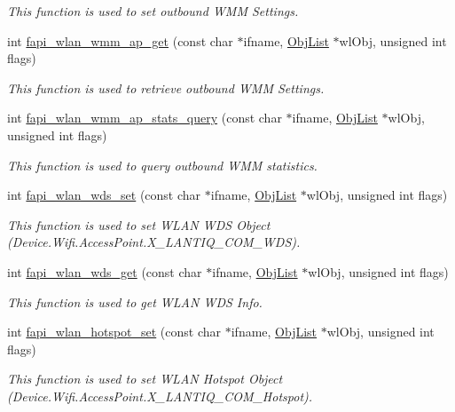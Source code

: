 \begin{DoxyCompactItemize}
\begin{DoxyCompactList}\small\item\em This function is used to set outbound W\-M\-M Settings. \end{DoxyCompactList}\item 
int \hyperlink{group__FAPI__WLAN_ga2e376f7c91b1ad78798cef51e687d574}{fapi\-\_\-wlan\-\_\-wmm\-\_\-ap\-\_\-get} (const char $\ast$ifname, \hyperlink{structObjList}{Obj\-List} $\ast$wl\-Obj, unsigned int flags)
\begin{DoxyCompactList}\small\item\em This function is used to retrieve outbound W\-M\-M Settings. \end{DoxyCompactList}\item 
int \hyperlink{group__FAPI__WLAN_gaa266e1fd19620a8d479804d74052a014}{fapi\-\_\-wlan\-\_\-wmm\-\_\-ap\-\_\-stats\-\_\-query} (const char $\ast$ifname, \hyperlink{structObjList}{Obj\-List} $\ast$wl\-Obj, unsigned int flags)
\begin{DoxyCompactList}\small\item\em This function is used to query outbound W\-M\-M statistics. \end{DoxyCompactList}\item 
int \hyperlink{group__FAPI__WLAN_gaf7b35fbc48c273637fafb13bbe2318fa}{fapi\-\_\-wlan\-\_\-wds\-\_\-set} (const char $\ast$ifname, \hyperlink{structObjList}{Obj\-List} $\ast$wl\-Obj, unsigned int flags)
\begin{DoxyCompactList}\small\item\em This function is used to set W\-L\-A\-N W\-D\-S Object (Device.\-Wifi.\-Access\-Point.\-X\-\_\-\-L\-A\-N\-T\-I\-Q\-\_\-\-C\-O\-M\-\_\-\-W\-D\-S). \end{DoxyCompactList}\item 
int \hyperlink{group__FAPI__WLAN_ga974e67dc47918f3c347aa26ecf903345}{fapi\-\_\-wlan\-\_\-wds\-\_\-get} (const char $\ast$ifname, \hyperlink{structObjList}{Obj\-List} $\ast$wl\-Obj, unsigned int flags)
\begin{DoxyCompactList}\small\item\em This function is used to get W\-L\-A\-N W\-D\-S Info. \end{DoxyCompactList}\item 
int \hyperlink{group__FAPI__WLAN_gaaf73570c24d2fd4d244e8498bb91952b}{fapi\-\_\-wlan\-\_\-hotspot\-\_\-set} (const char $\ast$ifname, \hyperlink{structObjList}{Obj\-List} $\ast$wl\-Obj, unsigned int flags)
\begin{DoxyCompactList}\small\item\em This function is used to set W\-L\-A\-N Hotspot Object (Device.\-Wifi.\-Access\-Point.\-X\-\_\-\-L\-A\-N\-T\-I\-Q\-\_\-\-C\-O\-M\-\_\-\-Hotspot). \end{DoxyCompactList}\item 

\end{DoxyCompactItemize}

